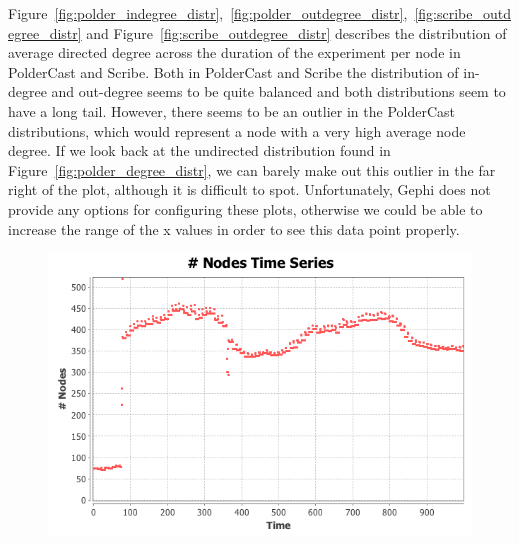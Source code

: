 Figure~\ref{fig:polder_indegree_distr},~\ref{fig:polder_outdegree_distr},~\ref{fig:scribe_outdegree_distr}
and Figure~\ref{fig:scribe_outdegree_distr} describes the distribution
of average directed degree across the duration of the experiment per
node in PolderCast and Scribe. Both in PolderCast and Scribe the
distribution of in-degree and out-degree seems to be quite balanced and
both distributions seem to have a long tail. However, there seems to be
an outlier in the PolderCast distributions, which would represent a node
with a very high average node degree. If we look back at the undirected
distribution found in Figure~\ref{fig:polder_degree_distr}, we can
barely make out this outlier in the far right of the plot, although it
is difficult to spot.  Unfortunately, Gephi does not provide any options
for configuring these plots, otherwise we could be able to increase the
range of the x values in order to see this data point properly.

\begin{figure}[Ht]
    \centering
    \includegraphics[scale=0.5]{plots/polder_nodes_ts}
    \label{fig:polder_node_ts}
\end{figure}

